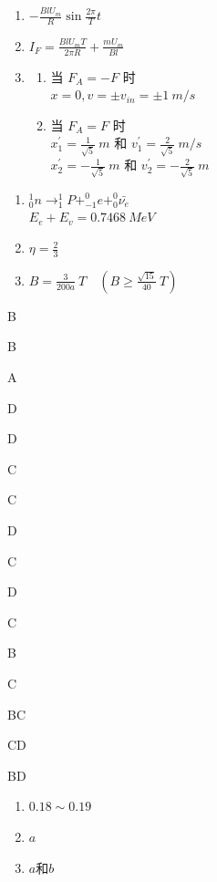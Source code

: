 \item \begin {enumerate} \item $-\frac {B l U_{m}}{R} \sin \frac {2 \pi }{T} t$ \item $I_{F}=\frac {B l U_{m} T}{2 \pi R}+\frac {m U_{m}}{B l}$ \item \begin {enumerate} \item 当 $F_{A}=-F$ 时\\ $ x=0, v=\pm v_{in}=\pm 1\ m / s$ \item 当 $F_{A}=F$ 时\\ $x_{1}^{\prime }=\frac {1}{\sqrt {5}} \ m$ 和 $v_{1}^{\prime }=\frac {2}{\sqrt {5}} \ m / s $\\ $ x_{2}^{\prime }=-\frac {1}{\sqrt {5}} \ m$ 和 $v_{2}^{\prime }=-\frac {2}{\sqrt {5}} \ m$ \end {enumerate} \end {enumerate}
\item \begin {enumerate} \item $ ^{1}_{0}n \rightarrow ^{1}_{1}P + ^{0}_{-1}e + ^{0}_{0} \bar {\nu _{e}} $\\ $E_{e}+E_{v}=0.7468 \ MeV$ \item $\eta =\frac {2}{3}$ \item $B=\frac {3}{200 a} \ T \quad (B \geqslant \frac {\sqrt {15}}{40} \ T) $ \end {enumerate}
\item B
\item B
\item A
\item D
\item D
\item C
\item C
\item D
\item C
\item D
\item C
\item B
\item C
\item BC
\item CD
\item BD
\item \begin {enumerate} \item $0.18 \sim 0.19$ \item $ a $ \item $ a $和$ b $ \par \end {enumerate}
